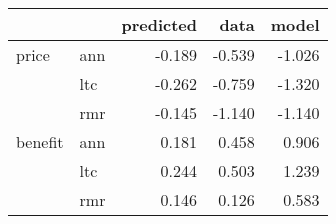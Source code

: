 \begin{tabular}{llrrr}
\toprule
        &     &  predicted &   data &  model \\
\midrule
price & ann &     -0.189 & -0.539 & -1.026 \\
        & ltc &     -0.262 & -0.759 & -1.320 \\
        & rmr &     -0.145 & -1.140 & -1.140 \\
benefit & ann &      0.181 &  0.458 &  0.906 \\
        & ltc &      0.244 &  0.503 &  1.239 \\
        & rmr &      0.146 &  0.126 &  0.583 \\
\bottomrule
\end{tabular}
